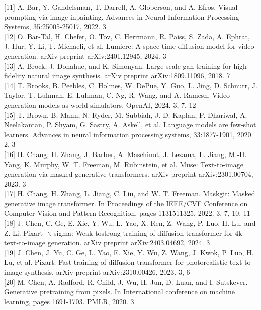 \documentclass{article}
\begin{document}
[11] A. Bar, Y. Gandelsman, T. Darrell, A. Globerson, and A. Efros. Visual prompting via image inpainting. Advances in Neural Information Processing Systems, 35:25005-25017, 2022. 3\\[0pt]
[12] O. Bar-Tal, H. Chefer, O. Tov, C. Herrmann, R. Paiss, S. Zada, A. Ephrat, J. Hur, Y. Li, T. Michaeli, et al. Lumiere: A space-time diffusion model for video generation. arXiv preprint arXiv:2401.12945, 2024. 3\\[0pt]
[13] A. Brock, J. Donahue, and K. Simonyan. Large scale gan training for high fidelity natural image synthesis. arXiv preprint arXiv:1809.11096, 2018. 7\\[0pt]
[14] T. Brooks, B. Peebles, C. Holmes, W. DePue, Y. Guo, L. Jing, D. Schnurr, J. Taylor, T. Luhman, E. Luhman, C. Ng, R. Wang, and A. Ramesh. Video generation models as world simulators. OpenAI, 2024. 3, 7, 12\\[0pt]
[15] T. Brown, B. Mann, N. Ryder, M. Subbiah, J. D. Kaplan, P. Dhariwal, A. Neelakantan, P. Shyam, G. Sastry, A. Askell, et al. Language models are few-shot learners. Advances in neural information processing systems, 33:1877-1901, 2020. 2, 3\\[0pt]
[16] H. Chang, H. Zhang, J. Barber, A. Maschinot, J. Lezama, L. Jiang, M.-H. Yang, K. Murphy, W. T. Freeman, M. Rubinstein, et al. Muse: Text-to-image generation via masked generative transformers. arXiv preprint arXiv:2301.00704, 2023. 3\\[0pt]
[17] H. Chang, H. Zhang, L. Jiang, C. Liu, and W. T. Freeman. Maskgit: Masked generative image transformer. In Proceedings of the IEEE/CVF Conference on Computer Vision and Pattern Recognition, pages 1131511325, 2022. 3, 7, 10, 11\\[0pt]
[18] J. Chen, C. Ge, E. Xie, Y. Wu, L. Yao, X. Ren, Z. Wang, P. Luo, H. Lu, and Z. Li. Pixart- $\backslash$ sigma: Weak-tostrong training of diffusion transformer for 4k text-to-image generation. arXiv preprint arXiv:2403.04692, 2024. 3\\[0pt]
[19] J. Chen, J. Yu, C. Ge, L. Yao, E. Xie, Y. Wu, Z. Wang, J. Kwok, P. Luo, H. Lu, et al. Pixart: Fast training of diffusion transformer for photorealistic text-to-image synthesis. arXiv preprint arXiv:2310.00426, 2023. 3, 6\\[0pt]
[20] M. Chen, A. Radford, R. Child, J. Wu, H. Jun, D. Luan, and I. Sutskever. Generative pretraining from pixels. In International conference on machine learning, pages 1691-1703. PMLR, 2020. 3\\[0pt]
\end{document}
